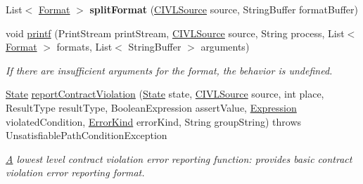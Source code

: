 \begin{DoxyCompactItemize}
\item 
\hypertarget{interfaceedu_1_1udel_1_1cis_1_1vsl_1_1civl_1_1semantics_1_1IF_1_1Executor_a5bb0d04cdcf2f422e621bf756e90bfa6}{}List$<$ \hyperlink{classedu_1_1udel_1_1cis_1_1vsl_1_1civl_1_1semantics_1_1IF_1_1Format}{Format} $>$ {\bfseries split\+Format} (\hyperlink{interfaceedu_1_1udel_1_1cis_1_1vsl_1_1civl_1_1model_1_1IF_1_1CIVLSource}{C\+I\+V\+L\+Source} source, String\+Buffer format\+Buffer)\label{interfaceedu_1_1udel_1_1cis_1_1vsl_1_1civl_1_1semantics_1_1IF_1_1Executor_a5bb0d04cdcf2f422e621bf756e90bfa6}

\item 
void \hyperlink{interfaceedu_1_1udel_1_1cis_1_1vsl_1_1civl_1_1semantics_1_1IF_1_1Executor_a7d1dfb9d41445da360b1fe56a0fea98a}{printf} (Print\+Stream print\+Stream, \hyperlink{interfaceedu_1_1udel_1_1cis_1_1vsl_1_1civl_1_1model_1_1IF_1_1CIVLSource}{C\+I\+V\+L\+Source} source, String process, List$<$ \hyperlink{classedu_1_1udel_1_1cis_1_1vsl_1_1civl_1_1semantics_1_1IF_1_1Format}{Format} $>$ formats, List$<$ String\+Buffer $>$ arguments)
\begin{DoxyCompactList}\small\item\em If there are insufficient arguments for the format, the behavior is undefined. \end{DoxyCompactList}\item 
\hyperlink{interfaceedu_1_1udel_1_1cis_1_1vsl_1_1civl_1_1state_1_1IF_1_1State}{State} \hyperlink{interfaceedu_1_1udel_1_1cis_1_1vsl_1_1civl_1_1semantics_1_1IF_1_1Executor_a88152dc2df5a27b3576f4ba8141239b2}{report\+Contract\+Violation} (\hyperlink{interfaceedu_1_1udel_1_1cis_1_1vsl_1_1civl_1_1state_1_1IF_1_1State}{State} state, \hyperlink{interfaceedu_1_1udel_1_1cis_1_1vsl_1_1civl_1_1model_1_1IF_1_1CIVLSource}{C\+I\+V\+L\+Source} source, int place, Result\+Type result\+Type, Boolean\+Expression assert\+Value, \hyperlink{interfaceedu_1_1udel_1_1cis_1_1vsl_1_1civl_1_1model_1_1IF_1_1expression_1_1Expression}{Expression} violated\+Condition, \hyperlink{enumedu_1_1udel_1_1cis_1_1vsl_1_1civl_1_1model_1_1IF_1_1CIVLException_1_1ErrorKind}{Error\+Kind} error\+Kind, String group\+String)  throws Unsatisfiable\+Path\+Condition\+Exception
\begin{DoxyCompactList}\small\item\em \hyperlink{structA}{A} lowest level contract violation error reporting function\+: provides basic contract violation error reporting format. \end{DoxyCompactList}\end{DoxyCompactItemize}



